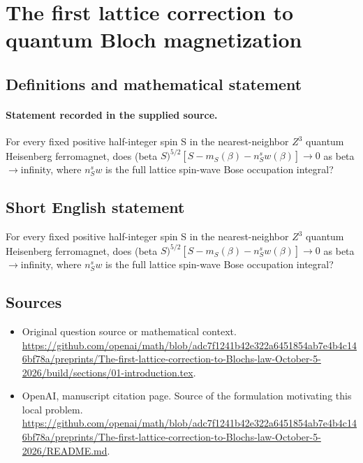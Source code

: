 \documentclass[11pt]{article}
\begin{document}
\section*{The first lattice correction to quantum Bloch magnetization}\label{statement}
\subsection{Definitions and mathematical statement}
\paragraph{Statement recorded in the supplied source.}
For every fixed positive half-integer spin S in the nearest-neighbor $Z^3$ quantum Heisenberg ferromagnet, does (beta $S)^{5/2}[S-m_S(\beta )-n_S^sw(\beta )]\to 0$ as beta$\to$infinity, where $n_S^sw$ is the full lattice spin-wave Bose occupation integral?
\subsection{Short English statement}
For every fixed positive half-integer spin S in the nearest-neighbor $Z^3$ quantum Heisenberg ferromagnet, does (beta $S)^{5/2}[S-m_S(\beta )-n_S^sw(\beta )]\to 0$ as beta$\to$infinity, where $n_S^sw$ is the full lattice spin-wave Bose occupation integral?
\subsection{Sources}
\begin{itemize}
\item[S1] Original question source or mathematical context.
\url{https://github.com/openai/math/blob/adc7f1241b42e322a6451854ab7e4b4c146bf78a/preprints/The-first-lattice-correction-to-Blochs-law-October-5-2026/build/sections/01-introduction.tex}.
\item[S2] OpenAI, manuscript citation page. Source of the formulation motivating this local problem.
\url{https://github.com/openai/math/blob/adc7f1241b42e322a6451854ab7e4b4c146bf78a/preprints/The-first-lattice-correction-to-Blochs-law-October-5-2026/README.md}.
\end{itemize}
\end{document}
